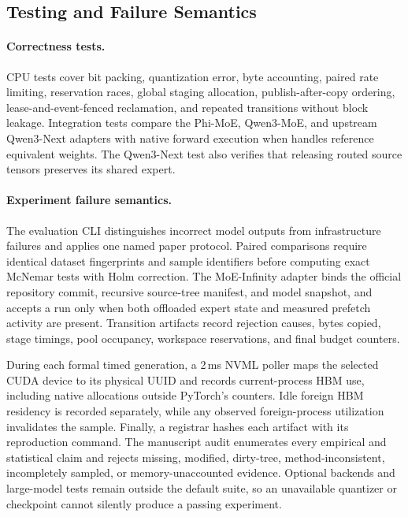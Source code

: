 \subsection{Testing and Failure Semantics}

\paragraph{Correctness tests.}
CPU tests cover bit packing, quantization error, byte accounting, paired rate limiting, reservation races, global staging allocation, publish-after-copy ordering, lease-and-event-fenced reclamation, and repeated transitions without block leakage. Integration tests compare the Phi-MoE, Qwen3-MoE, and upstream Qwen3-Next adapters with native forward execution when handles reference equivalent weights. The Qwen3-Next test also verifies that releasing routed source tensors preserves its shared expert.

\paragraph{Experiment failure semantics.}
The evaluation CLI distinguishes incorrect model outputs from infrastructure failures and applies one named paper protocol. Paired comparisons require identical dataset fingerprints and sample identifiers before computing exact McNemar tests with Holm correction. The MoE-Infinity adapter binds the official repository commit, recursive source-tree manifest, and model snapshot, and accepts a run only when both offloaded expert state and measured prefetch activity are present. Transition artifacts record rejection causes, bytes copied, stage timings, pool occupancy, workspace reservations, and final budget counters.

During each formal timed generation, a 2\,ms NVML poller maps the selected CUDA device to its physical UUID and records current-process HBM use, including native allocations outside PyTorch's counters. Idle foreign HBM residency is recorded separately, while any observed foreign-process utilization invalidates the sample. Finally, a registrar hashes each artifact with its reproduction command. The manuscript audit enumerates every empirical and statistical claim and rejects missing, modified, dirty-tree, method-inconsistent, incompletely sampled, or memory-unaccounted evidence. Optional backends and large-model tests remain outside the default suite, so an unavailable quantizer or checkpoint cannot silently produce a passing experiment.
